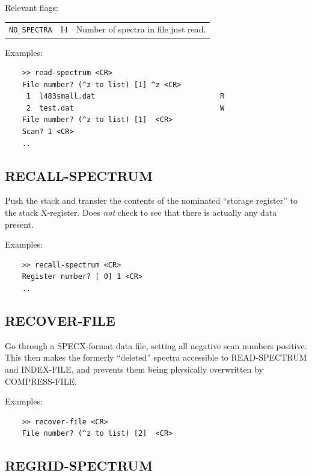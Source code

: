 \documentclass[11pt,twoside]{report}
\begin{document}
Relevant flags:\\
\begin{tabular}{lll}
  \verb+NO_SPECTRA+ &I4 & Number of spectra in file just read.
\end{tabular}

Examples:
\begin{verbatim}
    >> read-spectrum <CR>
    File number? (^z to list) [1] ^z <CR>
     1  l483small.dat                             R 
     2  test.dat                                  W 
    File number? (^z to list) [1]  <CR>
    Scan? 1 <CR>
    ..
\end{verbatim}

\subsection{RECALL-SPECTRUM} 

Push the stack and transfer the contents of the nominated ``storage register''
to the stack X-register. Does {\em not} check to see that there is actually
any data present.

Examples:
\begin{verbatim}
    >> recall-spectrum <CR>
    Register number? [ 0] 1 <CR>
    ..
\end{verbatim}

\subsection{RECOVER-FILE} 

Go through a  SPECX-format data file, setting all negative scan numbers
positive. This then makes the formerly ``deleted'' spectra accessible to
READ-SPECTRUM and INDEX-FILE, and prevents them being physically overwritten
by COMPRESS-FILE.  

Examples:
\begin{verbatim}
    >> recover-file <CR>
    File number? (^z to list) [2]  <CR>
\end{verbatim}

\subsection{REGRID-SPECTRUM} 
\end{document}
